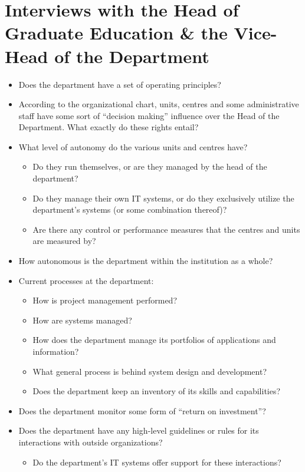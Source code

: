 \section*{Interviews with the Head of Graduate Education \& the Vice-Head of the Department}
\begin{itemize}
\item Does the department have a set of operating principles?
\item According to the organizational chart, units, centres and some administrative staff have some sort of ``decision making'' influence over the Head of the Department. What exactly do these rights entail? 
\item What level of autonomy do the various units and centres have? 
	\begin{itemize}
		\item Do they run themselves, or are they managed by the head of the department?
		\item Do they manage their own IT systems, or do they exclusively utilize the department’s systems (or some combination thereof)?
		\item Are there any control or performance measures that the centres and units are measured by?
	\end{itemize}
\item How autonomous is the department within the institution as a whole?
\item Current processes at the department:
  \begin{itemize}
		\item How is project management performed?
		\item How are systems managed?
		\item How does the department manage its portfolios of applications and information?
		\item What general process is behind system design and development?
		\item Does the department keep an inventory of its skills and capabilities?
	\end{itemize}
\item Does the department monitor some form of ``return on investment''?
\item Does the department have any high-level guidelines or rules for its interactions with outside organizations?
  \begin{itemize} 
    \item Do the department’s IT systems offer support for these interactions?
  \end{itemize}

\end{itemize}
